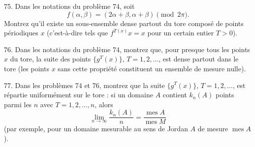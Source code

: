 \begin{problem}{75.}
    Dans les notations du problème 74, soit
    \begin{equation*}
        f(\alpha, \beta)=(2\alpha+\beta,\alpha+\beta) \pmod{2\pi}.
    \end{equation*}
    Montrez qu’il existe un sous-ensemble dense partout du tore composé de points périodiques $x$ (c’est-à-dire tels que
    $f^{T (x)} x=x$ pour un certain entier $T>0$).
\end{problem}

\begin{problem}{76.}
    Dans les notations du problème 74, montrez que, pour presque tous les points $x$ du tore,
    la suite des points $\{g^T (x)\}$, $T=1, 2, \dotsc$, est dense partout dans le tore
    (les points $x$ sans cette propriété constituent un ensemble de mesure nulle).
\end{problem}

\begin{problem}{77.}
    Dans les problèmes 74 et 76, montrez que la suite $\{g^T (x)\}$, $T=1, 2, \dotsc$, est répartie
    uniformément sur le tore : si un domaine $A$ contient $k_n(A)$ points parmi les $n$ avec $T=1, 2, \dotsc,n$, alors
    \begin{equation*}
        \lim_{n \to \infty} \frac{k_n(A)}{n}=\frac{\operatorname{mes} A}{\operatorname{mes} M}
    \end{equation*}
    (par exemple, pour un domaine mesurable au sens de Jordan $A$ de mesure $\operatorname{mes} A$).
\end{problem}
\clearpage

